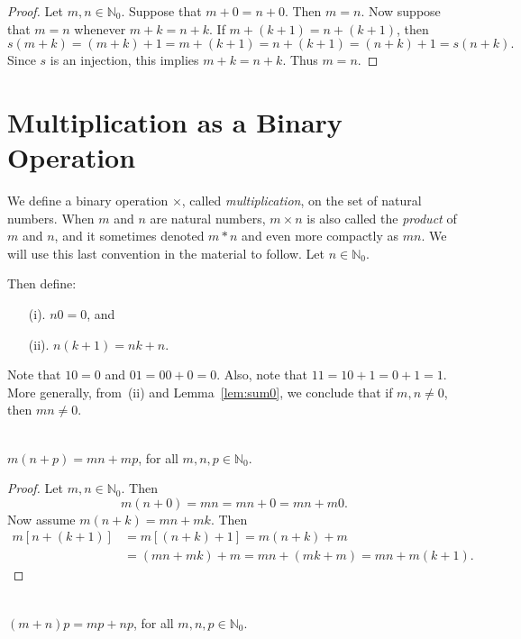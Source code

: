 \begin{proof}
Let $m,n\in \mathbb{N}_0$.  Suppose that $m+0=n+0$.  Then $m=n$.
Now suppose that $m=n$ whenever $m+k=n+k$.
If $m+(k+1)=n+(k+1)$, then 
\[
s(m+k)=(m+k)+1=m+(k+1)=n+(k+1)=(n+k)+1=s(n+k).
\]
Since $s$ is an
injection, this implies $m+k=n+k$.  Thus $m=n$.
\end{proof}

\section{Multiplication as a Binary Operation}\label{s:background:mult}

We define a binary operation $\times$, called \textit{multiplication}, 
on the set of natural numbers.  When $m$ and $n$ are natural
numbers, $m\times n$ is also called the \textit{product}
of $m$ and $n$, and it sometimes denoted 
$m*n$ and even more compactly as $mn$.  We will use this
last convention in the material to follow. Let $n\in \mathbb{N}_0$. 

Then define:

\begin{enumerate}
\item[(i).] $n0=0$, and
\item[(ii).] $n(k+1)=nk +n$.
\end{enumerate}

Note that $10=0$ and $01=00+0=0$.  Also, note that $11=10+1=0+1=1$.
More generally, from~(ii) and Lemma~\ref{lem:sum0}, we 
conclude that if $m,n\neq0$, then $mn\neq0$.

\begin{theorem}{}\\
$m(n+p)=mn + mp$, for all $m,n,p\in \mathbb{N}_0$.
\end{theorem}

\begin{proof}
Let $m,n\in \mathbb{N}_0$.  Then 
\[
m(n+0)=mn = mn +0 = mn+ m0.
\]
Now assume $m(n+k) = mn + mk$.
Then
\begin{align*}
m[n+(k+1)] &= m[(n+k)+1]=m(n+k)+m\\
&=(mn+mk)+m=mn+(mk+m)= mn+m(k+1).
\end{align*}
\end{proof}

\begin{theorem}{}\\
$(m+n)p=mp + np$, for all $m,n,p\in \mathbb{N}_0$.
\end{theorem}

